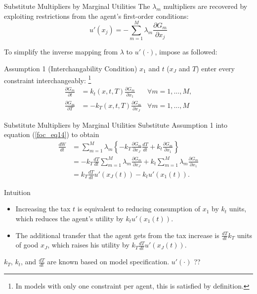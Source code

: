 \documentclass{beamer}
\begin{document}
\begin{frame}{Substitute Multipliers by Marginal Utilities}
	The $\lambda_m$ multipliers are recovered by exploiting restrictions from the agent’s first-order conditions:
	\begin{equation}\nonumber
		u'(x_j) = -\sum_{m=1}^M\lambda_m\frac{\partial G_m}{\partial x_j}
	\end{equation}

	To simplify the inverse mapping from $\lambda$ to $u'(\cdot)$, impose as followed:
	\begin{block}{Assumption 1 (Interchangability Condition)}
		$x_1$ and $t$ ($x_J$ and $T$) enter every constraint interchangeably: \footnote{In models with only one constraint per agent, this is satisfied by definition.}
		\begin{equation}\label{assumption1}\nonumber
			\begin{aligned}
				\frac{\partial G_m}{\partial t} &= k_t(x,t,T)\frac{\partial G_m}{\partial x_1} &\forall m=1,...,M, \\
				\frac{\partial G_m}{\partial T} &= -k_T(x,t,T)\frac{\partial G_m}{\partial x_J} &\forall m=1,...,M
			\end{aligned}
		\end{equation}
	\end{block}
\end{frame}
\begin{frame}{Substitute Multipliers by Marginal Utilities}
	Substitute Assumption 1 into equation (\ref{foc_eq14}) to obtain
	\begin{equation}
		\begin{aligned}
			\frac{dW}{dt} &= \sum_{m=1}^M\lambda_m\left\{-k_T\frac{\partial G_m}{\partial x_J}\frac{dT}{dt} + k_t\frac{\partial G_m}{\partial x_1}\right\} \\
			&= -k_T\frac{dT}{dt}\sum_{m=1}^M\lambda_m\frac{\partial G_m}{\partial x_J} + k_t\sum_{m=1}^M\lambda_m\frac{\partial G_m}{\partial x_1} \\
			&= k_T\frac{dT}{dt}u'(x_J(t)) - k_tu'(x_1(t)).
		\end{aligned}
	\end{equation}
	\begin{block}{Intuition}
		\begin{itemize}
			\item Increasing the tax $t$ is equivalent to reducing consumption of $x_1$ by $k_t$ units, which reduces the agent’s utility by $k_tu'(x_1(t))$.
			\item The additional transfer that the agent gets from the tax increase is $\frac{dT}{dt}k_T$ units of good $x_J$, which raises his utility by $k_T\frac{dT}{dt}u'(x_J(t))$.
		\end{itemize}
		$k_T$, $k_t$, and $\frac{dT}{dt}$ are known based on model specification. $u'(\cdot)$ ??
	\end{block}
\end{frame}
\end{document}

